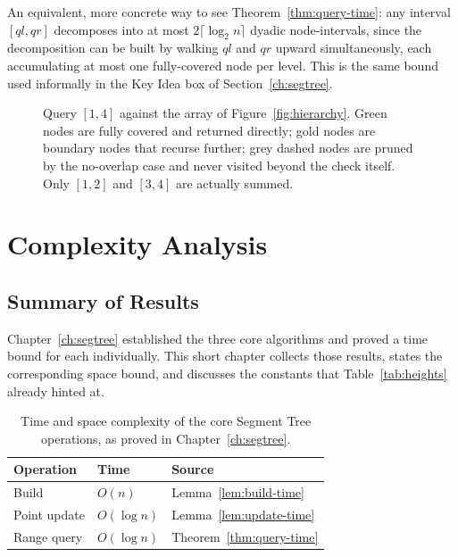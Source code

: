 \documentclass[
  11pt,
  a4paper,
  twoside=false,
  numbers=noenddot,
  headings=big,
  parskip=half,
  toc=bibliography,
  toc=listof,
  bibliography=totoc
]{scrreprt}
\newcounter{example}[chapter]
\newcommand{\Oh}[1]{O\!\left(#1\right)}
\newcommand{\tblhead}[1]{\textbf{\sffamily #1}}
\begin{document}
\begin{remark}
An equivalent, more concrete way to see Theorem~\ref{thm:query-time}: any interval $[ql,qr]$ decomposes into at most $2\lceil \log_2 n\rceil$ dyadic node-intervals, since the decomposition can be built by walking $ql$ and $qr$ upward simultaneously, each accumulating at most one fully-covered node per level. This is the same bound used informally in the Key Idea box of Section~\ref{ch:segtree}.
\end{remark}

\begin{figure}[H]
\centering
{}
\caption{Query $[1,4]$ against the array of Figure~\ref{fig:hierarchy}. Green nodes are fully covered and returned directly; gold nodes are boundary nodes that recurse further; grey dashed nodes are pruned by the no-overlap case and never visited beyond the check itself. Only $[1,2]$ and $[3,4]$ are actually summed.}
\label{fig:query-example}
\end{figure}

\chapter{Complexity Analysis}
\label{ch:complexity}

\section{Summary of Results}
Chapter~\ref{ch:segtree} established the three core algorithms and proved a time bound for each individually. This short chapter collects those results, states the corresponding space bound, and discusses the constants that Table~\ref{tab:heights} already hinted at.

\begin{table}[h]
\centering
\caption{Time and space complexity of the core Segment Tree operations, as proved in Chapter~\ref{ch:segtree}.}
\label{tab:complexity-ch4}
\begin{tabular}{llp{6.3cm}}
\toprule
\tblhead{Operation} & \tblhead{Time} & \tblhead{Source} \\
\midrule
Build          & $\Oh{n}$        & Lemma~\ref{lem:build-time} \\
Point update   & $\Oh{\log n}$   & Lemma~\ref{lem:update-time} \\
Range query    & $\Oh{\log n}$   & Theorem~\ref{thm:query-time} \\
\bottomrule
\end{tabular}
\end{table}
\end{document}
